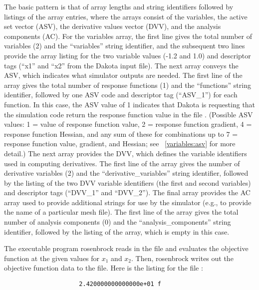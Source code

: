 The basic pattern is that of array lengths and string identifiers
followed by listings of the array entries, where the arrays consist of
the variables, the active set vector (ASV), the derivative values
vector (DVV), and the analysis components (AC). For the variables
array, the first line gives the total number of variables (2) and the
``variables'' string identifier, and the subsequent two lines provide
the array listing for the two variable values (-1.2 and 1.0) and
descriptor tags (``x1'' and ``x2'' from the Dakota input file). The
next array conveys the ASV, which indicates what
simulator outputs are needed. The first line of the array gives the total number
of response functions (1) and the ``functions'' string identifier,
followed by one ASV code and descriptor tag
(``ASV\_1'') for each function. In this case, the ASV value of 1 indicates that Dakota
is requesting that the simulation code return the response function
value in the file . (Possible ASV values: 1 = value of
response function value, 2 = response function gradient, 4 = response
function Hessian, and any sum of these for combinations up to
7 = response function value, gradient, and Hessian; see ~\ref{variables:asv} for
more detail.)  The next array provides the DVV, which defines the
variable identifiers used in computing derivatives. The first line of
the array gives the number of derivative variables (2) and the
``derivative\_variables'' string identifier, followed by the listing of
the two DVV variable identifiers (the first and second variables) and
descriptor tags (``DVV\_1'' and ``DVV\_2''). The final array provides
the AC array used to provide additional strings for use by the
simulator (e.g., to provide the name of a particular mesh file). The
first line of the array gives the total number of analysis components
(0) and the ``analysis\_components'' string identifier, followed by the
listing of the array, which is empty in this case.

The executable program rosenbrock reads in the 
file and evaluates the objective function at the given values for
$x_1$ and $x_2$. Then, rosenbrock writes out
the objective function data to the  file. Here
is the listing for the file :
\begin{small}
\begin{verbatim}
                     2.420000000000000e+01 f
\end{verbatim}
\end{small}

